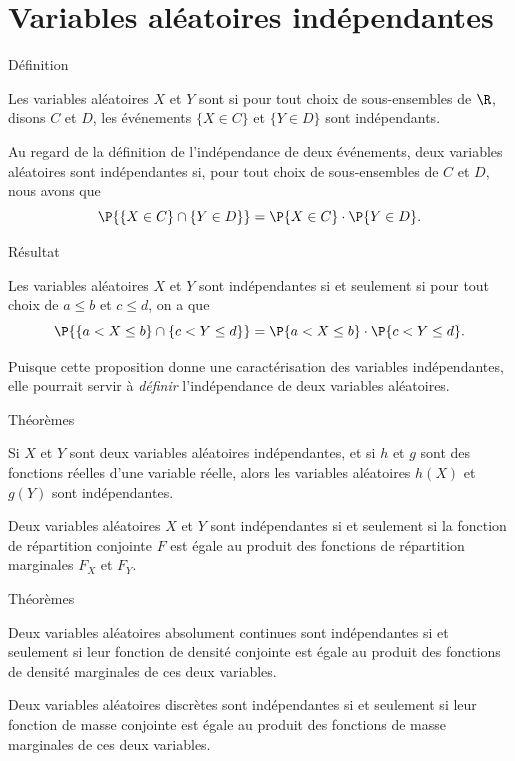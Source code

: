 \documentclass[nuit,charter,pied]{BeamerJS}
\begin{document}
\section[V.a. indépendantes]{Variables aléatoires indépendantes}
\begin{frame}[t]{Définition}
	\begin{defn}{}
		Les variables aléatoires $X$ et $Y$ sont  si pour tout choix de sous-ensembles de $\R$, disons $C$ et $D$, les événements $\{X\in C\}$ et $\{Y\in D\}$ sont indépendants.
	\end{defn}
	Au regard de la définition de l'indépendance de deux événements, deux variables aléatoires sont indépendantes si, pour tout choix de sous-ensembles de $C$ et $D$, nous avons que
	\[\P{\{X\in C\}\cap\{Y\in D\}}=\P{X\in C}\cdot \P{Y\in D}.\]
\end{frame}
\begin{frame}[t]{Résultat}
	\begin{prop}
		Les variables aléatoires $X$ et $Y$ sont indépendantes si et seulement si pour tout choix de $a\leq b$ et $c\leq d$, on a que
		\[\P{\{a<X\leq b\}\cap\{c<Y\leq d\}}=\P{a<X\leq b}\cdot \P{c<Y\leq d}.\]
	\end{prop}
	Puisque cette proposition donne une caractérisation des variables indépendantes, elle pourrait servir à \textit{définir} l'indépendance de deux variables aléatoires.
\end{frame}
\begin{frame}[t]{Théorèmes}
	\begin{thm}
		Si $X$ et $Y$ sont deux variables aléatoires indépendantes, et si $h$ et $g$ sont des fonctions réelles d'une variable réelle, alors les variables aléatoires $h(X)$ et $g(Y)$ sont indépendantes.
	\end{thm}
	\begin{thm}
		Deux variables aléatoires $X$ et $Y$ sont indépendantes si et seulement si la fonction de répartition conjointe $F$ est égale au produit des fonctions de répartition marginales $F_X$ et $F_Y$.
	\end{thm}
\end{frame}
\begin{frame}[t]{Théorèmes}
	\begin{thm}
		Deux variables aléatoires absolument continues sont indépendantes si et seulement si leur fonction de densité conjointe est égale au produit des fonctions de densité marginales de ces deux variables.
	\end{thm}
	\begin{thm}
		Deux variables aléatoires discrètes sont indépendantes si et seulement si leur fonction de masse conjointe est égale au produit des fonctions de masse marginales de ces deux variables.
	\end{thm}
\end{frame}
\end{document}
